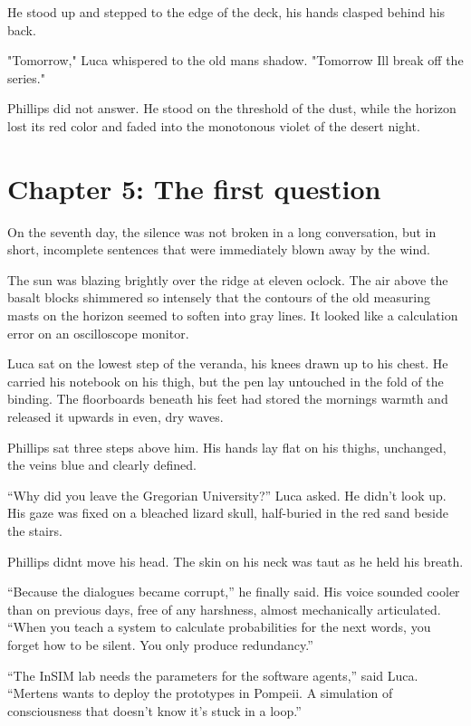 \documentclass[
  ngerman,
]{article}
\begin{document}
He stood up and stepped to the edge of the deck, his hands clasped
behind his back.

"Tomorrow," Luca whispered to the old man\textquotesingle s shadow.
"Tomorrow I\textquotesingle ll break off the series."

Phillips did not answer. He stood on the threshold of the dust, while
the horizon lost its red color and faded into the monotonous violet of
the desert night.

\section{Chapter 5: The first
question}\label{chapter-5-the-first-question}

On the seventh day, the silence was not broken in a long conversation,
but in short, incomplete sentences that were immediately blown away by
the wind.

The sun was blazing brightly over the ridge at eleven
o\textquotesingle clock. The air above the basalt blocks shimmered so
intensely that the contours of the old measuring masts on the horizon
seemed to soften into gray lines. It looked like a calculation error on
an oscilloscope monitor.

Luca sat on the lowest step of the veranda, his knees drawn up to his
chest. He carried his notebook on his thigh, but the pen lay untouched
in the fold of the binding. The floorboards beneath his feet had stored
the morning\textquotesingle s warmth and released it upwards in even,
dry waves.

Phillips sat three steps above him. His hands lay flat on his thighs,
unchanged, the veins blue and clearly defined.

``Why did you leave the Gregorian University?'' Luca asked. He didn't
look up. His gaze was fixed on a bleached lizard skull, half-buried in
the red sand beside the stairs.

Phillips didn\textquotesingle t move his head. The skin on his neck was
taut as he held his breath.

``Because the dialogues became corrupt,'' he finally said. His voice
sounded cooler than on previous days, free of any harshness, almost
mechanically articulated. ``When you teach a system to calculate
probabilities for the next words, you forget how to be silent. You only
produce redundancy.''

``The InSIM lab needs the parameters for the software agents,'' said
Luca. ``Mertens wants to deploy the prototypes in Pompeii. A simulation
of consciousness that doesn't know it's stuck in a loop.''
\end{document}
